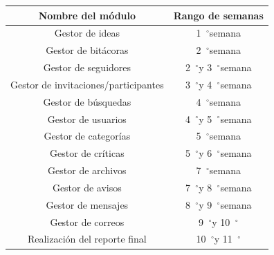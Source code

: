 \documentclass[12pt,letterpaper,titlepage]{article}
\newcommand{\grad}{\hspace{-2mm}$\phantom{a}^{\circ}$}
\begin{document}
\begin{center}
\begin{tabular}{|c|c|}\hline
Nombre del m\'odulo & Rango de semanas\\ \hline\hline
Gestor de ideas&1\grad semana \\ \hline
Gestor de bit\'acoras&2\grad semana \\ \hline
Gestor de seguidores&2\grad y 3\grad semana\\ \hline
Gestor de invitaciones/participantes&3\grad y 4\grad semana \\ \hline
Gestor de b\'usquedas&4\grad semana \\ \hline
Gestor de usuarios&4\grad y 5\grad semana \\ \hline
Gestor de categor\'ias&5\grad semana \\ \hline
Gestor de cr\'iticas&5\grad y 6\grad semana \\ \hline
Gestor de archivos&7\grad semana\\ \hline
Gestor de avisos&7\grad y 8\grad semana\\ \hline
Gestor de mensajes&8\grad y 9\grad semana\\ \hline
Gestor de correos&9\grad y 10\grad \\ \hline
Realizaci\'on del reporte final&10\grad y 11\grad \\ \hline
\end{tabular}
\end{center}


% 
% 
\end{document}
